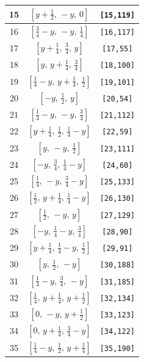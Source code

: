 \documentclass[fleqn,8pt]{jsarticle}
\begin{document}
\begin{longtable}{ccc}
15 & $\left[ y + \frac{1}{2},\, - y,\, 0 \right]$ & {\tt [15,119]} \\ \hline
16 & $\left[ \frac{3}{4} - y,\, - y,\, \frac{1}{4} \right]$ & {\tt [16,117]} \\ \hline
17 & $\left[ y + \frac{1}{4},\, \frac{3}{4},\, y \right]$ & {\tt [17,55]} \\ \hline
18 & $\left[ y,\, y + \frac{1}{4},\, \frac{3}{4} \right]$ & {\tt [18,100]} \\ \hline
19 & $\left[ \frac{1}{4} - y,\, y + \frac{1}{4},\, \frac{1}{2} \right]$ & {\tt [19,101]} \\ \hline
20 & $\left[ - y,\, \frac{1}{2},\, y \right]$ & {\tt [20,54]} \\ \hline
21 & $\left[ \frac{1}{4} - y,\, - y,\, \frac{3}{4} \right]$ & {\tt [21,112]} \\ \hline
22 & $\left[ y + \frac{1}{4},\, \frac{1}{2},\, \frac{1}{4} - y \right]$ & {\tt [22,59]} \\ \hline
23 & $\left[ y,\, - y,\, \frac{1}{2} \right]$ & {\tt [23,111]} \\ \hline
24 & $\left[ - y,\, \frac{3}{4},\, \frac{1}{4} - y \right]$ & {\tt [24,60]} \\ \hline
25 & $\left[ \frac{1}{4},\, - y,\, \frac{3}{4} - y \right]$ & {\tt [25,133]} \\ \hline
26 & $\left[ \frac{1}{2},\, y + \frac{1}{4},\, \frac{1}{4} - y \right]$ & {\tt [26,130]} \\ \hline
27 & $\left[ \frac{1}{2},\, - y,\, y \right]$ & {\tt [27,129]} \\ \hline
28 & $\left[ - y,\, \frac{1}{4} - y,\, \frac{3}{4} \right]$ & {\tt [28,90]} \\ \hline
29 & $\left[ y + \frac{1}{4},\, \frac{1}{4} - y,\, \frac{1}{2} \right]$ & {\tt [29,91]} \\ \hline
30 & $\left[ y,\, \frac{1}{2},\, - y \right]$ & {\tt [30,188]} \\ \hline
31 & $\left[ \frac{1}{4} - y,\, \frac{3}{4},\, - y \right]$ & {\tt [31,185]} \\ \hline
32 & $\left[ \frac{1}{4},\, y + \frac{1}{4},\, y + \frac{1}{2} \right]$ & {\tt [32,134]} \\ \hline
33 & $\left[ 0,\, - y,\, y + \frac{1}{2} \right]$ & {\tt [33,123]} \\ \hline
34 & $\left[ 0,\, y + \frac{1}{4},\, \frac{3}{4} - y \right]$ & {\tt [34,122]} \\ \hline
35 & $\left[ \frac{1}{4} - y,\, \frac{1}{2},\, y + \frac{1}{4} \right]$ & {\tt [35,190]} \\ \hline

\end{longtable}
\end{document}
